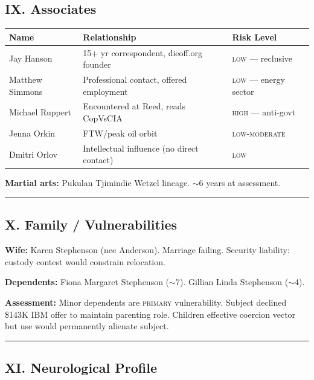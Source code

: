 \subsection*{IX. Associates}
\label{interlude:associates}

{%
\small
\begin{tabular}{p{3.2cm} p{6.5cm} p{3.8cm}}
\hline
\textbf{Name} & \textbf{Relationship} & \textbf{Risk Level} \\
\hline
Jay Hanson & 15+ yr correspondent, dieoff.org founder & \textsc{low} --- reclusive \\
Matthew Simmons & Professional contact, offered employment & \textsc{low} --- energy sector \\
Michael Ruppert & Encountered at Reed, reads CopVsCIA & \textsc{high} --- anti-govt \\
Jenna Orkin & FTW/peak oil orbit & \textsc{low-moderate} \\
Dmitri Orlov & Intellectual influence (no direct contact) & \textsc{low} \\
\hline
\end{tabular}
}%

\medskip

\textbf{Martial arts:} Pukulan Tjimindie Wetzel lineage. $\sim$6 years at assessment.

\vspace{1cm}\hrule\vspace{1cm}

\subsection*{X. Family / Vulnerabilities}
\label{interlude:family-vulnerabilities}

\textbf{Wife:} Karen Stephenson (nee Anderson). Marriage failing. Security liability: custody contest would constrain relocation.

\textbf{Dependents:} Fiona Margaret Stephenson ($\sim$7). Gillian Linda Stephenson ($\sim$4).

\textbf{Assessment:} Minor dependents are \textsc{primary} vulnerability. Subject declined \$143K IBM offer to maintain parenting role. Children effective coercion vector but use would permanently alienate subject.

\vspace{1cm}\hrule\vspace{1cm}

\subsection*{XI. Neurological Profile}
\label{interlude:neurological-profile}

